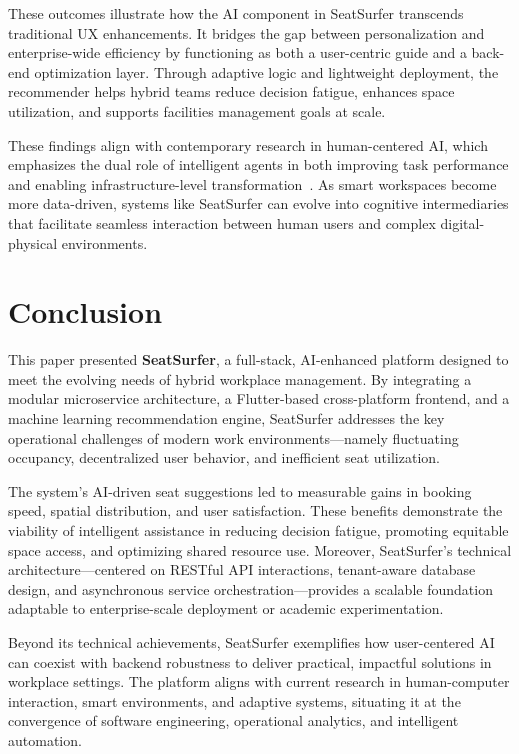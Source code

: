 \documentclass[onecolumn, 12pt]{IEEEtran}
\begin{document}
These outcomes illustrate how the AI component in SeatSurfer transcends traditional UX enhancements. It bridges the gap between personalization and enterprise-wide efficiency by functioning as both a user-centric guide and a back-end optimization layer. Through adaptive logic and lightweight deployment, the recommender helps hybrid teams reduce decision fatigue, enhances space utilization, and supports facilities management goals at scale.

These findings align with contemporary research in human-centered AI, which emphasizes the dual role of intelligent agents in both improving task performance and enabling infrastructure-level transformation~\cite{brown2022usertracking,zhang2022envaware}. As smart workspaces become more data-driven, systems like SeatSurfer can evolve into cognitive intermediaries that facilitate seamless interaction between human users and complex digital-physical environments.

\section{Conclusion}

This paper presented \textbf{SeatSurfer}, a full-stack, AI-enhanced platform designed to meet the evolving needs of hybrid workplace management. By integrating a modular microservice architecture, a Flutter-based cross-platform frontend, and a machine learning recommendation engine, SeatSurfer addresses the key operational challenges of modern work environments—namely fluctuating occupancy, decentralized user behavior, and inefficient seat utilization.

The system's AI-driven seat suggestions led to measurable gains in booking speed, spatial distribution, and user satisfaction. These benefits demonstrate the viability of intelligent assistance in reducing decision fatigue, promoting equitable space access, and optimizing shared resource use. Moreover, SeatSurfer's technical architecture—centered on RESTful API interactions, tenant-aware database design, and asynchronous service orchestration—provides a scalable foundation adaptable to enterprise-scale deployment or academic experimentation.

Beyond its technical achievements, SeatSurfer exemplifies how user-centered AI can coexist with backend robustness to deliver practical, impactful solutions in workplace settings. The platform aligns with current research in human-computer interaction, smart environments, and adaptive systems, situating it at the convergence of software engineering, operational analytics, and intelligent automation.
\end{document}
